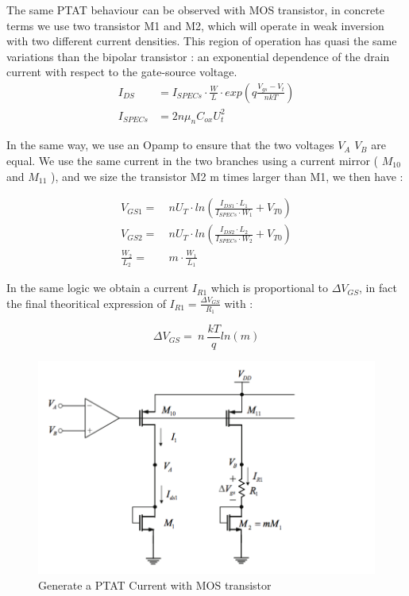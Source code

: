 \documentclass[11pt,a4paper]{report}
\begin{document}
The same PTAT behaviour can be observed with MOS transistor, in concrete terms we use two transistor M1 and M2, which will operate in weak inversion with two different current densities. This region of operation has quasi the same variations than the bipolar transistor : an exponential dependence of the drain current with respect to the gate-source voltage.
\begin{align}
  I_{DS} & = I_{SPECs} \cdot \frac{W}{L} \cdot exp\left( q\frac{V_{gs}-V_t}{nkT} \right) \\
  I_{SPECs} & = 2 n \mu_{n} C_{ox} U_t^2
\end{align}

\newpage

In the same way, we use an Opamp to ensure that the two voltages $V_A$ $V_B$ are equal. We use the same current in the two branches using a current mirror ( $M_{10}$ and $M_{11}$ ), and we size the transistor M2 m times larger than M1, we then have :

\begin{align}
  V_{GS1} = & ~ n U_T \cdot ln\left( \frac{I_{DS1} \cdot L_1}{I_{SPECs} \cdot W_1} + V_{T0} \right) \\ 
  V_{GS2} = & ~ n U_T \cdot ln\left( \frac{I_{DS2} \cdot L_2}{I_{SPECs} \cdot W_2} + V_{T0} \right) \\
  \frac{W_2}{L_2} = & ~ m \cdot \frac{W_1}{L_1}
\end{align}

In the same logic we obtain a current $I_{R1}$ which is proportional to $\Delta V_{GS}$, in fact the final theoritical expression of $I_{R1} = \frac{\Delta V_{GS}}{R_1}$ with :

\begin{equation}
  \Delta V_{GS} = ~n~\frac{kT}{q}ln(m)
\end{equation} 

\begin{figure}[h]
  \begin{center}
    \includegraphics[scale=0.3]{photo/PTAT_MOS}
  \end{center}
  \caption{Generate a PTAT Current with MOS transistor}
  \label{PTAT_MOS}
\end{figure}
\end{document}

